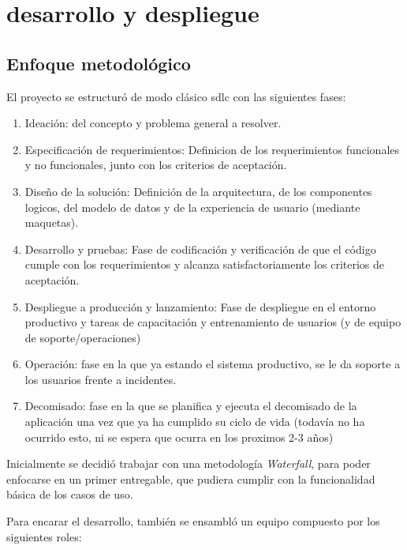 \chapter{desarrollo y despliegue}
\section{Enfoque metodológico}

El proyecto se estructuró de modo clásico \gls{sdlc} con las siguientes fases:

\begin{enumerate}
    \item Ideación: del concepto y problema general a resolver.
    \item Especificación de requerimientos: Definicion de los requerimientos funcionales y no funcionales, junto con los criterios de aceptación.
    \item Diseño de la solución: Definición de la arquitectura, de los componentes logicos, del modelo de datos y de la experiencia de usuario (mediante maquetas).
    \item Desarrollo y pruebas: Fase de codificación y verificación de que el código cumple con los requerimientos y alcanza satisfactoriamente los criterios de aceptación.
    \item Despliegue a producción y lanzamiento: Fase de despliegue en el entorno productivo y tareas de capacitación y entrenamiento de usuarios (y de equipo de soporte/operaciones)
    \item Operación: fase en la que ya estando el sistema productivo, se le da soporte a los usuarios frente a incidentes.
    \item Decomisado: fase en la que se planifica y ejecuta el decomisado de la aplicación una vez que ya ha cumplido su ciclo de vida (todavía no ha ocurrido esto, ni se espera que ocurra en los proximos 2-3 años)
\end{enumerate}


Inicialmente se decidió trabajar con una metodología \emph{Waterfall}, para poder enfocarse en un primer entregable, que pudiera cumplir con la funcionalidad básica de los casos de uso.


Para encarar el desarrollo, también se ensambló un equipo compuesto por los siguientes roles:

